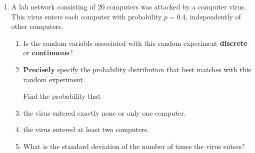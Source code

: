 \documentclass[11pt]{article}\usepackage[]{graphicx}\usepackage[]{color}
\begin{document}

\pagestyle{fancy} 


\begin{enumerate}
	\item A lab network consisting of 20 computers was attacked by a computer virus.  This virus enters each computer with probability $p= 0.4$, independently of other computers.  
           \begin{enumerate}
             \item Is the random variable associated with this random experiment \textbf{discrete} or \textbf{continuous}?
             
           \item \textbf{Precisely} specify the probability distribution that best matches with this random experiment.\vspace{0.7cm}
           
           Find the probability that
           \item the virus entered exactly none or only one computer.
           \vspace{1.5cm}
           
           \item the virus entered at least two computers.
           \vspace{1.5cm}
           \item What is the standard deviation of the number of times the virus enters?
           \vspace{0.5cm}
           \end{enumerate}
           

\end{enumerate}
\end{document}
